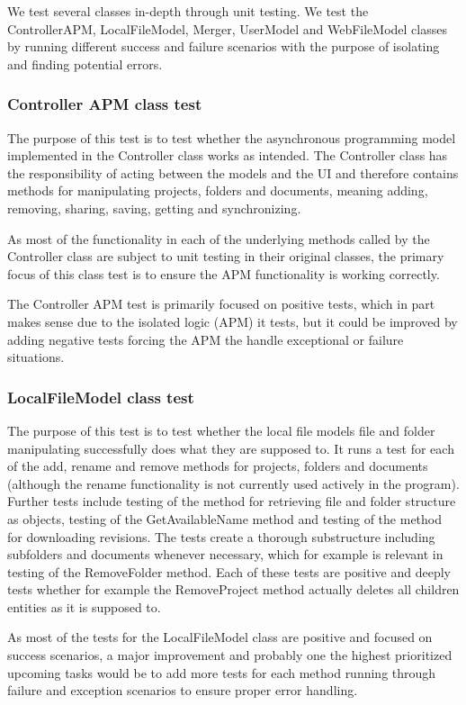 We test several classes in-depth through unit testing. We test the ControllerAPM, LocalFileModel, Merger, UserModel and WebFileModel classes by running different success and failure scenarios with the purpose of isolating and finding potential errors.

\subsubsection{Controller APM class test}
The purpose of this test is to test whether the asynchronous programming model implemented in the Controller class works as intended. The Controller class has the responsibility of acting between the models and the UI and therefore contains methods for manipulating projects, folders and documents, meaning adding, removing, sharing, saving, getting and synchronizing.

As most of the functionality in each of the underlying methods called by the Controller class are subject to unit testing in their original classes, the primary focus of this class test is to ensure the APM functionality is working correctly.

The Controller APM test is primarily focused on positive tests, which in part makes sense due to the isolated logic (APM) it tests, but it could be improved by adding negative tests forcing the APM the handle exceptional or failure situations.

\subsubsection{LocalFileModel class test}
The purpose of this test is to test whether the local file models file and folder manipulating successfully does what they are supposed to. It runs a test for each of the add, rename and remove methods for projects, folders and documents (although the rename functionality is not currently used actively in the program). Further tests include testing of the method for retrieving file and folder structure as objects, testing of the GetAvailableName method and testing of the method for downloading revisions. The tests create a thorough substructure including subfolders and documents whenever necessary, which for example is relevant in testing of the RemoveFolder method. Each of these tests are positive and deeply tests whether for example the RemoveProject method actually deletes all children entities as it is supposed to.

As most of the tests for the LocalFileModel class are positive and focused on success scenarios, a major improvement and probably one the highest prioritized upcoming tasks would be to add more tests for each method running through failure and exception scenarios to ensure proper error handling.

